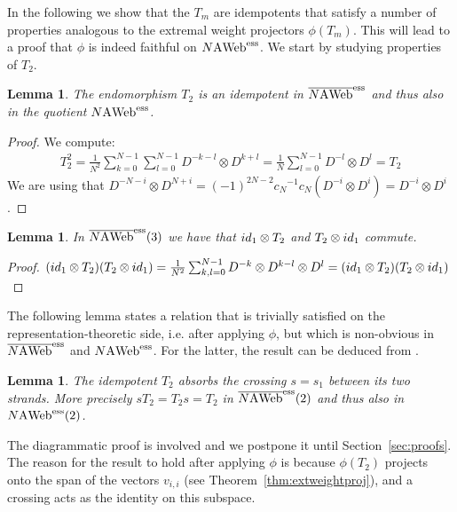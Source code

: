 \documentclass[11pt]{article}
\newtheorem{lemma}[theo]{Lemma}
\theoremstyle{definition}
\numberwithin{equation}{section}
\newcommand{\id}{{\rm id}}
\newcommand{\cat}[1]{\ensuremath{\mbox{\bfseries {\upshape {#1}}}}}
\newcommand{\wrap}{D}
\newcommand{\AWeb}[1][]{#1\cat{A}\cat{Web}}
\newcommand{\essAWeb}[1][]{#1\AWeb^{\mathrm{ess}}}
\newcommand{\essbAWeb}[1][]{\overline{#1\AWeb}^{\mathrm{ess}}}
\begin{document}
In the following we show that the $T_m$ are idempotents that satisfy a number of properties analogous to the extremal weight projectors $\phi(T_m)$. This will lead to a proof that $\phi$ is indeed faithful on $\essAWeb[N]$. We start by studying properties of $T_2$.

\begin{lemma} \label{lem_T2idem}The endomorphism $T_2$ is an idempotent in $\essbAWeb[N]$ and thus also in the quotient $\essAWeb[N]$.
\end{lemma}
\begin{proof}
We compute: 
\begin{align*}T_2^2 =  \frac{1}{N^2}\sum_{k=0}^{N-1}\sum_{l=0}^{N-1} \wrap^{-k-l} \otimes \wrap^{k+l} = \frac{1}{N}\sum_{l=0}^{N-1} \wrap^{-l} \otimes \wrap^l =T_2
\end{align*}
We are using that $\wrap^{-N-i}\otimes\wrap^{N+i} = (-1)^{2N-2}{c_N}^{-1}c_N (\wrap^{-i}\otimes\wrap^{i}) =\wrap^{-i}\otimes\wrap^{i}$.
\end{proof}

\begin{lemma} \label{lem:T2comm}
In $\essbAWeb[N](3)$ we have that $\id_1 \otimes T_2$ and $T_2\otimes \id_1$ commute. 
\end{lemma}
\begin{proof}
$(\id_1 \otimes T_2)(T_2\otimes \id_1)= \frac{1}{N^2}\sum_{k,l=0}^{N-1}\wrap^{-k} \otimes \wrap^{k-l}\otimes \wrap^{l} = (\id_1 \otimes T_2)(T_2\otimes \id_1)$
\end{proof}

The following lemma states a relation that is trivially satisfied on the
representation-theoretic side, i.e. after applying $\phi$, but which is
non-obvious in $\essbAWeb[N]$ and $\essAWeb[N]$. For the latter, the result can
be deduced from \cite[Equation (37)]{CK_ann}.

\begin{lemma}\label{lem:crossabs} The idempotent $T_2$ absorbs the crossing
$s=s_1$ between its two strands. More precisely $s T_2 = T_2 s = T_2$  in
$\essbAWeb[N](2)$ and thus also in $\essAWeb[N](2)$.
\end{lemma}

The diagrammatic proof is involved and we postpone it until
Section~\ref{sec:proofs}. The reason for the result to hold after applying
$\phi$ is because $\phi(T_2)$ projects onto the span of the vectors $v_{i,i}$
(see Theorem~\ref{thm:extweightproj}), and a crossing acts as the identity on
this subspace. 
\end{document}
